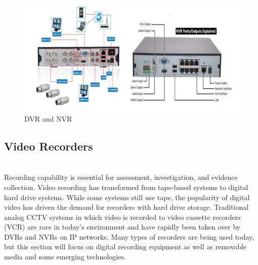 \documentclass[12pt,fleqn]{book} %
\begin{document}
\begin{enumerate}
                       \begin{figure}[!h]
    \centering
    \includegraphics[width=0.5\linewidth]{c 15.png}
    \caption{DVR and NVR}
    \label{fig:c 15}
    \end{figure}
\end{enumerate}
\subsection{Video Recorders}
\\ Recording capability is essential for assessment, investigation, and evidence collection. Video recording has transformed from tape-based systems to digital hard drive systems. While some systems still use tape, the popularity of digital video has driven the demand for recorders with hard drive storage. Traditional analog CCTV systems in which video is recorded to video cassette recorders (VCR) are rare in today’s environment and have rapidly been taken over by DVRs and NVRs on IP networks. Many types of recorders are being used today, but this section will focus on digital recording equipment as well as removable media and some emerging technologies.
\end{document}
